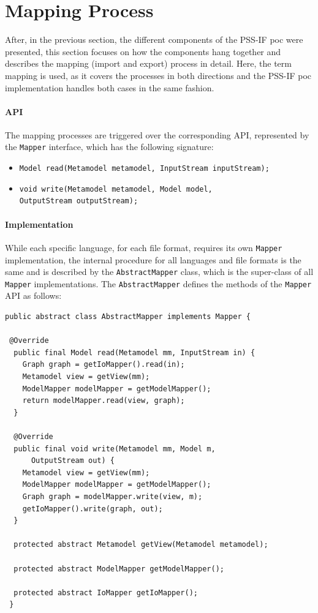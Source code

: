 \section{Mapping Process}
\label{sec:impl:process}

After, in the previous section, the different components of the PSS-IF \gls{poc} were presented, this section focuses on how the components hang together and describes the mapping (import and export) process in detail. Here, the term mapping is used, as it covers the processes in both directions and the PSS-IF \gls{poc} implementation handles both cases in the same fashion.

\paragraph{API} The mapping processes are triggered over the corresponding API, represented by the \texttt{Mapper} interface, which has the following signature:

\begin{itemize}
\item \texttt{Model read(Metamodel metamodel, InputStream inputStream);}
\item \texttt{void write(Metamodel metamodel, Model model,}\\ \texttt{OutputStream outputStream);}
\end{itemize}

\paragraph{Implementation} While each specific language, for each file format, requires its own \texttt{Mapper} implementation, the internal procedure for all languages and file formats is the same and is described by the \texttt{AbstractMapper} class, which is the super-class of all \texttt{Mapper} implementations. The \texttt{AbstractMapper} defines the methods of the \texttt{Mapper} API as follows:

\begin{verbatim}
public abstract class AbstractMapper implements Mapper {

 @Override
  public final Model read(Metamodel mm, InputStream in) {
    Graph graph = getIoMapper().read(in);
    Metamodel view = getView(mm);
    ModelMapper modelMapper = getModelMapper();
    return modelMapper.read(view, graph);
  }

  @Override
  public final void write(Metamodel mm, Model m, 
      OutputStream out) {
    Metamodel view = getView(mm);
    ModelMapper modelMapper = getModelMapper();
    Graph graph = modelMapper.write(view, m);
    getIoMapper().write(graph, out);
  }

  protected abstract Metamodel getView(Metamodel metamodel);

  protected abstract ModelMapper getModelMapper();

  protected abstract IoMapper getIoMapper();
 }
\end{verbatim}

